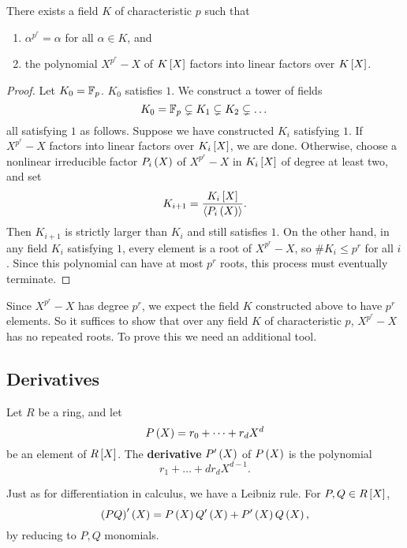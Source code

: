 \pagebreak

\begin{corollary}
There exists a field $ K $ of characteristic $ p $ such that
\begin{enumerate}
\item $ \alpha^{p^r} = \alpha $ for all $ \alpha \in K $, and
\item the polynomial $ X^{p^r} - X $ of $ K\sb{X} $ factors into linear factors over $ K\sb{X} $.
\end{enumerate}
\end{corollary}

\begin{proof}
Let $ K_0 = \F_p $. $ K_0 $ satisfies $ 1 $. We construct a tower of fields
$$ K_0 = \F_p \subsetneq K_1 \subsetneq K_2 \subsetneq \dots $$
all satisfying $ 1 $ as follows. Suppose we have constructed $ K_i $ satisfying $ 1 $. If $ X^{p^r} - X $ factors into linear factors over $ K_i\sb{X} $, we are done. Otherwise, choose a nonlinear irreducible factor $ P_i\rb{X} $ of $ X^{p^r} - X $ in $ K_i\sb{X} $ of degree at least two, and set
$$ K_{i + 1} = \dfrac{K_i\sb{X}}{\ab{P_i\rb{X}}}. $$
Then $ K_{i + 1} $ is strictly larger than $ K_i $ and still satisfies $ 1 $. On the other hand, in any field $ K_i $ satisfying $ 1 $, every element is a root of $ X^{p^r} - X $, so $ \#K_i \le p^r $ for all $ i $. Since this polynomial can have at most $ p^r $ roots, this process must eventually terminate.
\end{proof}

Since $ X^{p^r} - X $ has degree $ p^r $, we expect the field $ K $ constructed above to have $ p^r $ elements. So it suffices to show that over any field $ K $ of characteristic $ p $, $ X^{p^r} - X $ has no repeated roots. To prove this we need an additional tool.

\subsection{Derivatives}

\begin{definition}
Let $ R $ be a ring, and let
$$ P\rb{X} = r_0 + \dots + r_dX^d $$
be an element of $ R\sb{X} $. The \textbf{derivative} $ P'\rb{X} $ of $ P\rb{X} $ is the polynomial
$$ r_1 + \dots + dr_dX^{d - 1}. $$
\end{definition}

\begin{note*}
Just as for differentiation in calculus, we have a Leibniz rule. For $ P, Q \in R\sb{X} $,
$$ \rb{PQ}'\rb{X} = P\rb{X}Q'\rb{X} + P'\rb{X}Q\rb{X}, $$
by reducing to $ P, Q $ monomials.
\end{note*}

